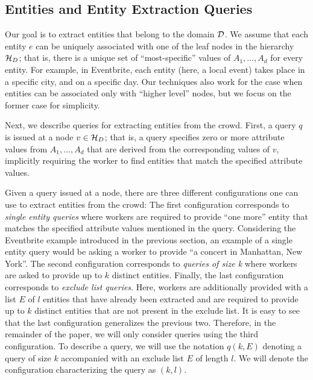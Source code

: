 \subsection{Entities and Entity Extraction Queries}
\label{sec:queries}

 Our goal is to extract entities that belong to the domain $\mathcal{D}$. We assume that each entity $e$ can be uniquely associated with one of the leaf nodes in the hierarchy $\mathcal{H}_D$; that is, there is a unique set of ``most-specific'' values of $A_1, \ldots, A_d$ for every entity. For example, in Eventbrite, each entity (here, a local event) takes place in a specific city, and on a specific day. Our techniques also work for the case when entities can be associated only with ``higher level'' nodes, but we focus on the former case for simplicity. 

 Next, we describe queries for extracting entities from the crowd. First, a query $q$ is issued at a node $v \in \mathcal{H}_D$; that is, a query specifies zero or more attribute values from $A_1, \ldots, A_d$ that are derived from the corresponding values of $v$, implicitly requiring the worker to find entities that match the specified attribute values.  

Given a query issued at a node, there are three different configurations one can use to extract entities from the crowd: The first configuration corresponds to {\em single entity queries} where workers are required to provide ``one more'' entity that matches the specified attribute values mentioned in the query. Considering the Eventbrite example introduced in the previous section, an example of a single entity query would be asking a worker to provide ``a concert in Manhattan, New York''. The second configuration corresponds to {\em queries of size k} where workers are asked to provide up to $k$ distinct entities. Finally, the last configuration corresponds to {\em exclude list queries}. Here,  workers are additionally provided with a list $E$ of $l$ entities that have already been extracted and are required to provide up to $k$ distinct entities that are not present in the exclude list. It is easy to see that the last configuration generalizes the previous two. Therefore, in the remainder of the paper, we will only consider queries using the third configuration. To describe a query, we will use the notation $q(k,E)$ denoting a query of size $k$ accompanied with an exclude list $E$ of length $l$. We will denote the configuration characterizing the query as $(k,l)$. 


